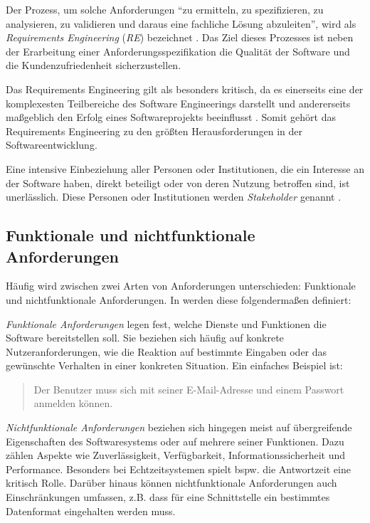 \documentclass[acmtog]{acmart}
\begin{document}
Der Prozess, um solche Anforderungen ``zu ermitteln, zu spezifizieren, zu analysieren, zu validieren und daraus eine fachliche Lösung abzuleiten'', wird als \emph{Requirements Engineering} (\emph{RE}) bezeichnet \cite{balzert09}.
Das Ziel dieses Prozesses ist neben der Erarbeitung einer Anforderungsspezifikation die Qualität der Software und die Kundenzufriedenheit sicherzustellen.

Das Requirements Engineering gilt als besonders kritisch, da es einerseits eine der komplexesten Teilbereiche des Software Engineerings darstellt und andererseits maßgeblich den Erfolg eines Softwareprojekts beeinflusst \cite{balzert09}.
Somit gehört das Requirements Engineering zu den größten Herausforderungen in der Softwareentwicklung.

Eine intensive Einbeziehung aller Personen oder Institutionen, die ein Interesse an der Software haben, direkt beteiligt oder von deren Nutzung betroffen sind, ist unerlässlich. Diese Personen oder Institutionen werden \emph{Stakeholder} genannt \cite{balzert09}.

\subsection{Funktionale und nichtfunktionale Anforderungen}
Häufig wird zwischen zwei Arten von Anforderungen unterschieden: Funktionale und nichtfunktionale Anforderungen. In \cite{sommerville16} werden diese folgendermaßen definiert:

\emph{Funktionale Anforderungen} legen fest, welche Dienste und Funktionen die Software bereitstellen soll. Sie beziehen sich häufig auf konkrete Nutzeranforderungen, wie die Reaktion auf bestimmte Eingaben oder das gewünschte Verhalten in einer konkreten Situation.
Ein einfaches Beispiel ist:
\begin{quote}
Der Benutzer muss sich mit seiner E-Mail-Adresse und einem Passwort anmelden können.
\end{quote}

\emph{Nichtfunktionale Anforderungen} beziehen sich hingegen meist auf übergreifende Eigenschaften des Softwaresystems oder auf mehrere seiner Funktionen. Dazu zählen Aspekte wie Zuverlässigkeit, Verfügbarkeit, Informationssicherheit und Performance. Besonders bei Echtzeitsystemen spielt bspw. die Antwortzeit eine kritisch Rolle. Darüber hinaus können nichtfunktionale Anforderungen auch Einschränkungen umfassen, z.B. dass für eine Schnittstelle ein bestimmtes Datenformat eingehalten werden muss.
\end{document}
